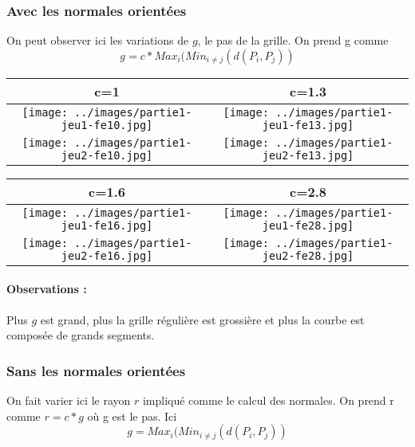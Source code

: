 \documentclass[11pt,a4paper]{article}
\begin{document}
\subsubsection{Avec les normales orientées}
On peut observer ici les variations de $g$, le pas de la grille. On prend g comme $$g=c*Max_i(Min_{i \neq j}(d(P_i,P_j))$$

\begin{center}
\begin{tabular}{|c|c|}
\hline
c=1         & c=1.3\\
\hline
\hline
\texttt{[image: ../images/partie1-jeu1-fe10.jpg]} & \texttt{[image: ../images/partie1-jeu1-fe13.jpg]} \\
\hline
\texttt{[image: ../images/partie1-jeu2-fe10.jpg]} & \texttt{[image: ../images/partie1-jeu2-fe13.jpg]} \\
\hline
\end{tabular}

\begin{tabular}{|c|c|}
\hline
c=1.6         & c=2.8\\
\hline
\hline
\texttt{[image: ../images/partie1-jeu1-fe16.jpg]} & \texttt{[image: ../images/partie1-jeu1-fe28.jpg]}\\
\hline
\texttt{[image: ../images/partie1-jeu2-fe16.jpg]} & \texttt{[image: ../images/partie1-jeu2-fe28.jpg]}\\
\hline
\end{tabular}
\end{center}
\paragraph{Observations :} Plus $g$ est grand, plus la grille régulière est grossière et plus la courbe est composée de
grands segments.

\subsubsection{Sans les normales orientées}
On fait varier ici le rayon $r$ impliqué comme le calcul des normales. On prend r comme $r=c*g$ où g est le pas. Ici
$$g=Max_i(Min_{i \neq j}(d(P_i,P_j))$$
\end{document}
